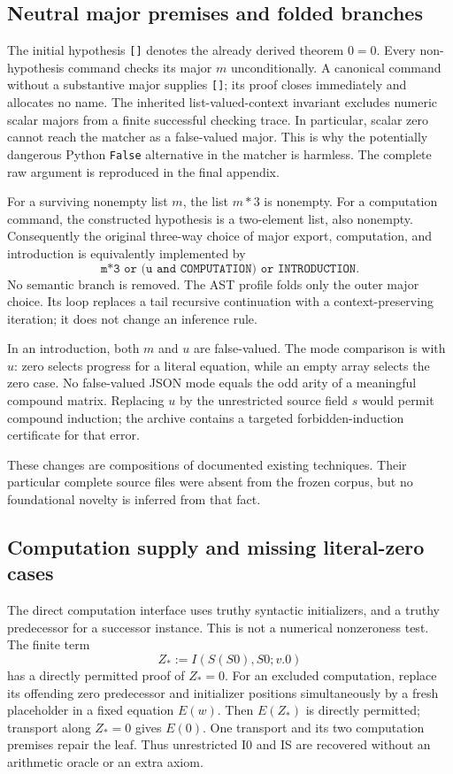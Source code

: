 \subsection{Neutral major premises and folded branches}
The initial hypothesis \texttt{[]} denotes the already derived theorem
$0=0$. Every non-hypothesis command checks its major $m$ unconditionally.
A canonical command without a substantive major supplies \texttt{[]};
its proof closes immediately and allocates no name. The inherited
list-valued-context invariant excludes numeric scalar majors from a
finite successful checking trace. In particular, scalar zero cannot
reach the matcher as a false-valued major. This is why the potentially
dangerous Python \texttt{False} alternative in the matcher is harmless.
The complete raw argument is reproduced in the final appendix.

For a surviving nonempty list $m$, the list $m*3$ is nonempty. For a
computation command, the constructed hypothesis is a two-element list,
also nonempty. Consequently the original three-way choice of major
export, computation, and introduction is equivalently implemented by
\[
 \texttt{m*3 or (u and COMPUTATION) or INTRODUCTION}.
\]
No semantic branch is removed. The AST profile folds only the outer
major choice. Its loop replaces a tail recursive continuation with a
context-preserving iteration; it does not change an inference rule.

In an introduction, both $m$ and $u$ are false-valued. The mode comparison
is with $u$: zero selects progress for a literal equation, while an
empty array selects the zero case. No false-valued JSON mode equals the
odd arity of a meaningful compound matrix. Replacing $u$ by the
unrestricted source field $s$ would permit compound induction; the
archive contains a targeted forbidden-induction certificate for that error.

These changes are compositions of documented existing techniques. Their
particular complete source files were absent from the frozen corpus,
but no foundational novelty is inferred from that fact.

\subsection{Computation supply and missing literal-zero cases}
The direct computation interface uses truthy syntactic initializers,
and a truthy predecessor for a successor instance. This is not a
numerical nonzeroness test. The finite term
\[
                     Z_*:=I(S(S0),S0;v.0)
\]
has a directly permitted proof of $Z_*=0$. For an excluded computation,
replace its offending zero predecessor and initializer positions
simultaneously by a fresh placeholder in a fixed equation $E(w)$.
Then $E(Z_*)$ is directly permitted; transport along $Z_*=0$ gives
$E(0)$. One transport and its two computation premises repair the
leaf. Thus unrestricted I0 and IS are recovered without an arithmetic
oracle or an extra axiom.

